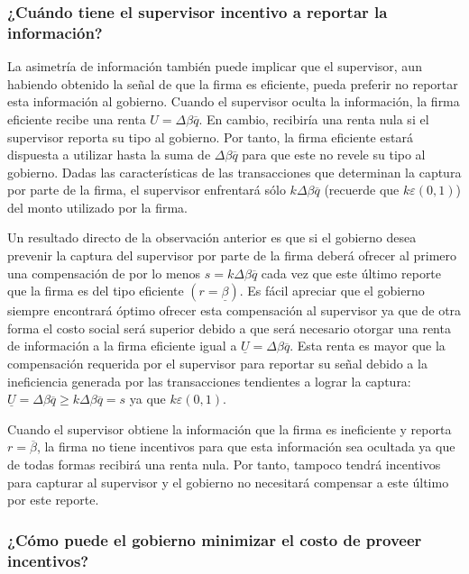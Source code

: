 \documentclass[
  12pt,
  spanish,
]{book}
\begin{document}
\hypertarget{cuuxe1ndo-tiene-el-supervisor-incentivo-a-reportar-la-informaciuxf3n}{%
\subsubsection{¿Cuándo tiene el supervisor incentivo a reportar la información?}\label{cuuxe1ndo-tiene-el-supervisor-incentivo-a-reportar-la-informaciuxf3n}}

La asimetría de información también puede implicar que el supervisor, aun habiendo obtenido la señal de que la firma es eficiente, pueda preferir no reportar esta información al gobierno. Cuando el supervisor oculta la información, la firma eficiente recibe una renta \(U = Δ\beta \overline q\). En cambio, recibiría una renta nula si el supervisor reporta su tipo al gobierno. Por tanto, la firma eficiente estará dispuesta a utilizar hasta la suma de \(Δ\beta \overline q\) para que este no revele su tipo al gobierno. Dadas las características de las transacciones que determinan la captura por parte de la firma, el supervisor enfrentará sólo \(k Δ\beta \overline q\) (recuerde que \(k ε (0,1)\)) del monto utilizado por la firma.

Un resultado directo de la observación anterior es que si el gobierno desea prevenir la captura del supervisor por parte de la firma deberá ofrecer al primero una compensación de por lo menos \(s = k Δ\beta \overline q\) cada vez que este último reporte que la firma es del tipo eficiente \((r = \underline β)\). Es fácil apreciar que el gobierno siempre encontrará óptimo ofrecer esta compensación al supervisor ya que de otra forma el costo social será superior debido a que será necesario otorgar una renta de información a la firma eficiente igual a \(\underline U = Δβ \overline q\). Esta renta es mayor que la compensación requerida por el supervisor para reportar su señal debido a la ineficiencia generada por las transacciones tendientes a lograr la captura: \(\underline U = Δβ \overline q \geq kΔβ \overline q = s\) ya que \(k ε (0,1)\).

Cuando el supervisor obtiene la información que la firma es ineficiente y reporta \(r = \overline β\), la firma no tiene incentivos para que esta información sea ocultada ya que de todas formas recibirá una renta nula. Por tanto, tampoco tendrá incentivos para capturar al supervisor y el gobierno no necesitará compensar a este último por este reporte.

\hypertarget{cuxf3mo-puede-el-gobierno-minimizar-el-costo-de-proveer-incentivos}{%
\subsubsection{¿Cómo puede el gobierno minimizar el costo de proveer incentivos?}\label{cuxf3mo-puede-el-gobierno-minimizar-el-costo-de-proveer-incentivos}}
\end{document}
